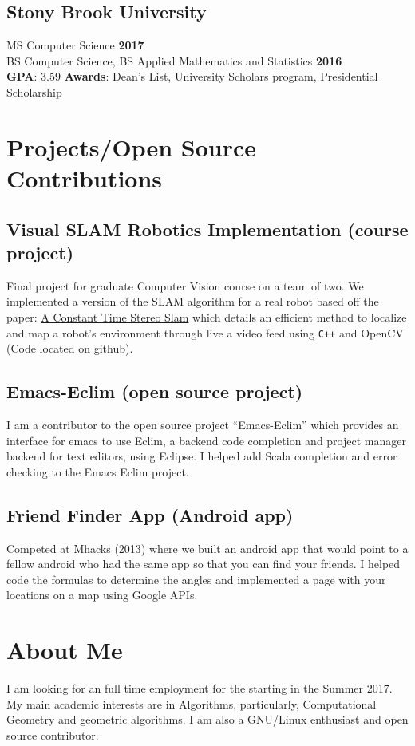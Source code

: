 \documentclass[5pt]{resume}
\begin{document}
\subsection{\textbf{Stony Brook University }}
{\color{default}MS Computer Science} \hfill \textbf{2017}\\
{\color{default}BS Computer Science, BS Applied Mathematics and Statistics} \hfill \textbf{2016} \\ 
\textbf{GPA}: {\color{default} 3.59} 
\textbf{Awards}: {\color{default}Dean’s List, University Scholars program, Presidential Scholarship}
{\color{titleColor}\section{Projects/Open Source Contributions}}
\subsection{\textbf{Visual SLAM Robotics Implementation (course project)}}
{\color{default} Final project for graduate Computer Vision course on a team of two. We
implemented a version of the SLAM algorithm for a real robot based off the
paper: \href{
  ''http://www.robots.ox.ac.uk/~cmei/articles/AConstantTimeEfficientStereoSLAMSystem_rss_09.pdf''}{A
  Constant Time Stereo Slam} which details an efficient method to localize and
map a robot's environment through live a video feed using \verb!C++! and OpenCV (Code
located on github).}
\subsection{\textbf{Emacs-Eclim (open source project)}}
{\color{default} I am a contributor to the open source project “Emacs-Eclim”
  which provides an interface for emacs to use Eclim, a backend code completion
  and project manager backend for text editors, using Eclipse. I helped add
  Scala completion and error checking to the Emacs Eclim project. }
\subsection{\textbf{Friend Finder App (Android app)}} 
{\color{default} Competed at Mhacks (2013) where we built an android app that
  would point to a fellow android who had the same app so that you can find your
  friends. I helped code the formulas to determine the angles and implemented a
  page with your locations on a map using Google APIs.}
{\color{titleColor}\section{About Me}}
{\color{default} I am looking for an full time employment for the starting in
  the Summer 2017. My main academic interests are in Algorithms, particularly,
  Computational Geometry and geometric algorithms. I am also a GNU/Linux
  enthusiast and open source contributor.}
\\
\end{document}
